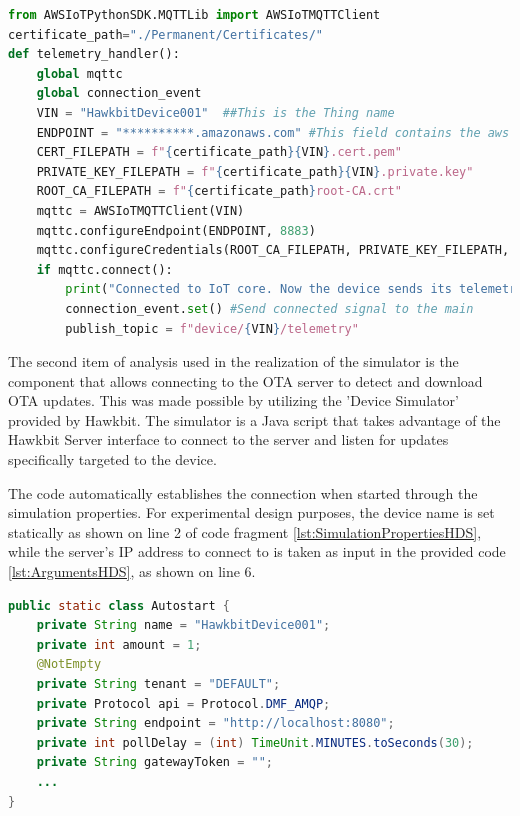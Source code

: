 \begin{lstlisting}[language=Python, caption={MQTT connection to the IoT Core AWS service}, label=lst:MQTTConnection, linerange={1-23}]
from AWSIoTPythonSDK.MQTTLib import AWSIoTMQTTClient
certificate_path="./Permanent/Certificates/"
def telemetry_handler():
    global mqttc
    global connection_event
    VIN = "HawkbitDevice001"  ##This is the Thing name
    ENDPOINT = "**********.amazonaws.com" #This field contains the aws region
    CERT_FILEPATH = f"{certificate_path}{VIN}.cert.pem"
    PRIVATE_KEY_FILEPATH = f"{certificate_path}{VIN}.private.key"
    ROOT_CA_FILEPATH = f"{certificate_path}root-CA.crt"
    mqttc = AWSIoTMQTTClient(VIN)
    mqttc.configureEndpoint(ENDPOINT, 8883)
    mqttc.configureCredentials(ROOT_CA_FILEPATH, PRIVATE_KEY_FILEPATH, CERT_FILEPATH)
    if mqttc.connect():
        print("Connected to IoT core. Now the device sends its telemetry every 1 seconds")
        connection_event.set() #Send connected signal to the main
        publish_topic = f"device/{VIN}/telemetry"
\end{lstlisting}

The second item of analysis used in the realization of the simulator is the component that allows connecting to the OTA server to detect and download OTA updates. This was made possible by utilizing the 'Device Simulator' provided by Hawkbit. The simulator is a Java script that takes advantage of the Hawkbit Server interface to connect to the server and listen for updates specifically targeted to the device.

The code automatically establishes the connection when started through the simulation properties. For experimental design purposes, the device name is set statically as shown on line 2 of code fragment \ref{lst:SimulationPropertiesHDS}, while the server's IP address to connect to is taken as input in the provided code \ref{lst:ArgumentsHDS}, as shown on line 6.

\begin{lstlisting}[language=Java, caption={Simulation properties of the Hawkbit Device Simulator}, label=lst:SimulationPropertiesHDS]
public static class Autostart {
    private String name = "HawkbitDevice001";
    private int amount = 1;
    @NotEmpty
    private String tenant = "DEFAULT";
    private Protocol api = Protocol.DMF_AMQP;
    private String endpoint = "http://localhost:8080";
    private int pollDelay = (int) TimeUnit.MINUTES.toSeconds(30);
    private String gatewayToken = "";
    ...
}
\end{lstlisting}

